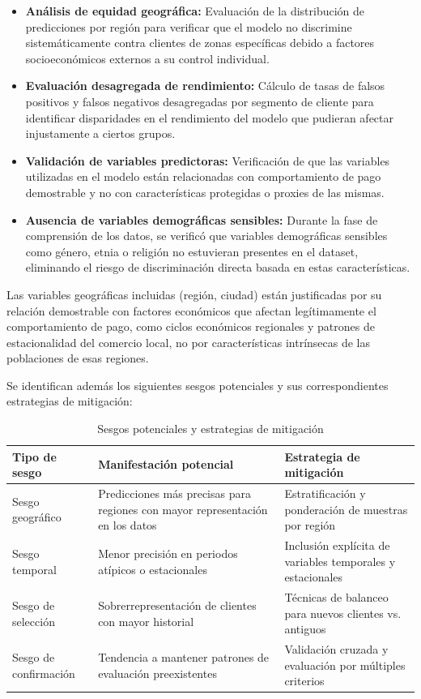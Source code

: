 \begin{itemize}
    \item \textbf{Análisis de equidad geográfica:} Evaluación de la distribución de predicciones por región para verificar que el modelo no discrimine sistemáticamente contra clientes de zonas específicas debido a factores socioeconómicos externos a su control individual.
    
    \item \textbf{Evaluación desagregada de rendimiento:} Cálculo de tasas de falsos positivos y falsos negativos desagregadas por segmento de cliente para identificar disparidades en el rendimiento del modelo que pudieran afectar injustamente a ciertos grupos.
    
    \item \textbf{Validación de variables predictoras:} Verificación de que las variables utilizadas en el modelo están relacionadas con comportamiento de pago demostrable y no con características protegidas o proxies de las mismas.
    
    \item \textbf{Ausencia de variables demográficas sensibles:} Durante la fase de comprensión de los datos, se verificó que variables demográficas sensibles como género, etnia o religión no estuvieran presentes en el dataset, eliminando el riesgo de discriminación directa basada en estas características.
\end{itemize}

    Las variables geográficas incluidas (región, ciudad) están justificadas por su relación demostrable con factores económicos que afectan legítimamente el comportamiento de pago, como ciclos económicos regionales y patrones de estacionalidad del comercio local, no por características intrínsecas de las poblaciones de esas regiones.
    
    Se identifican además los siguientes sesgos potenciales y sus correspondientes estrategias de mitigación:
    
\begin{table}[h]
\centering
\begin{tabular}{|p{4cm}|p{5cm}|p{5cm}|}
\hline
\textbf{Tipo de sesgo} & \textbf{Manifestación potencial} & \textbf{Estrategia de mitigación} \\
\hline
Sesgo geográfico & Predicciones más precisas para regiones con mayor representación en los datos & Estratificación y ponderación de muestras por región \\
\hline
Sesgo temporal & Menor precisión en periodos atípicos o estacionales & Inclusión explícita de variables temporales y estacionales \\
\hline
Sesgo de selección & Sobrerrepresentación de clientes con mayor historial & Técnicas de balanceo para nuevos clientes vs. antiguos \\
\hline
Sesgo de confirmación & Tendencia a mantener patrones de evaluación preexistentes & Validación cruzada y evaluación por múltiples criterios \\
\hline
\end{tabular}
\caption{Sesgos potenciales y estrategias de mitigación}

\end{table}



